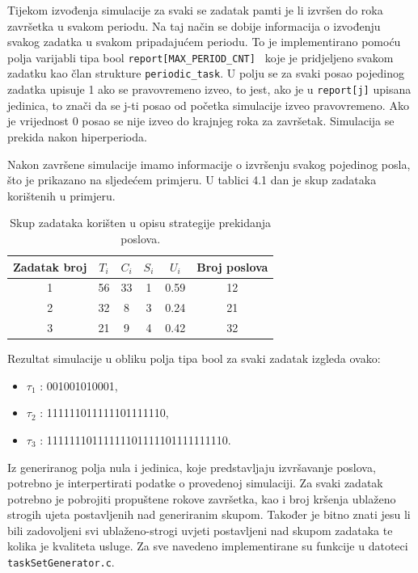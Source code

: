 \documentclass[../zavrsni.tex]{subfiles}
\begin{document}
Tijekom izvođenja simulacije za svaki se zadatak pamti je li izvršen do roka završetka u svakom periodu. 
Na taj način se dobije informacija o izvođenju svakog zadatka u svakom pripadajućem periodu. To je implementirano 
pomoću polja varijabli tipa bool \texttt{report[MAX\_PERIOD\_CNT] } koje je pridjeljeno svakom zadatku kao član strukture \texttt{periodic\_task}.
U polju se za svaki posao pojedinog zadatka upisuje 1 ako se pravovremeno izveo, to jest, ako je u \texttt{report[j]} upisana jedinica, to znači da se 
j-ti posao od početka simulacije izveo pravovremeno. Ako je vrijednost 0 posao se nije izveo do krajnjeg roka za završetak.
Simulacija se prekida nakon hiperperioda.

Nakon završene simulacije imamo informacije o izvršenju svakog pojedinog posla, što je prikazano na sljedećem primjeru. U tablici 4.1 dan je 
skup zadataka korištenih u primjeru.

\begin{table}[h!]
    \begin{center}
      \begin{tabular}{||c || c c c c c||} 
       \hline
       Zadatak broj & $T_i$ & $C_i$ & $S_i$ & $U_i$ & Broj poslova \\ [0.5ex] 
       \hline\hline
       1 & 56 & 33 & 1 & 0.59 & 12 \\ 
       \hline
       2 & 32 & 8 & 3 & 0.24 & 21 \\
       \hline
       3 & 21 & 9 & 4 & 0.42 & 32 \\
       \hline
      \end{tabular}
    \end{center}
    \caption{\label{tab:table-name}Skup zadataka korišten u opisu strategije prekidanja poslova.}
    \end{table}

Rezultat simulacije u obliku polja tipa bool za svaki zadatak izgleda ovako:

\begin{itemize}
        \item[] $\tau_1$ : 001001010001,
        \item[] $\tau_2$ : 111111011111101111110,
        \item[] $\tau_3$ : 11111110111111101111101111111110.
\end{itemize}

Iz generiranog polja nula i jedinica, koje predstavljaju izvršavanje poslova, potrebno je interpertirati podatke o provedenoj simulaciji.
Za svaki zadatak potrebno je pobrojiti propuštene rokove završetka, kao i broj kršenja ublaženo strogih ujeta postavljenih nad generiranim skupom.
Također je bitno znati jesu li bili zadovoljeni svi ublaženo-strogi uvjeti 
postavljeni nad skupom zadataka te kolika je kvaliteta usluge. Za sve navedeno implementirane su funkcije u datoteci \texttt{taskSetGenerator.c}.
\end{document}
